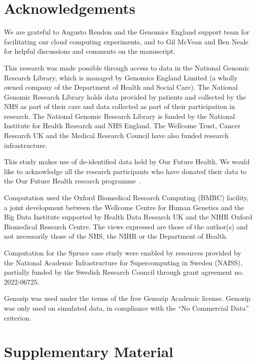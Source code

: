 \documentclass[a4paper,num-refs]{oup-contemporary}
\begin{document}
\section{Acknowledgements}
We are grateful to Augusto Rendon and the Genomics 
England support team for facilitating our cloud computing experiments,
and to Gil McVean and Ben Neale for helpful discussions and comments on the 
manuscript.

This research was made possible through access to data in the National Genomic
Research Library, which is managed by Genomics England Limited (a wholly owned
company of the Department of Health and Social Care). The National Genomic
Research Library holds data provided by patients and collected by the NHS as
part of their care and data collected as part of their participation in
research. The National Genomic Research Library is funded by the National
Institute for Health Research and NHS England. The Wellcome Trust, Cancer
Research UK and the Medical Research Council have also funded research
infrastructure.

This study makes use of de-identified data held by Our Future Health.
We would like to acknowledge all the research participants who have donated
their data to the Our Future Health research programme~\cite{ofhpubpolicy}.

Computation used the Oxford Biomedical Research Computing (BMRC) facility, a
joint development between the Wellcome Centre for Human Genetics and the Big
Data Institute supported by Health Data Research UK and the NIHR Oxford
Biomedical Research Centre. The views expressed are those of the author(s) and
not necessarily those of the NHS, the NIHR or the Department of Health.

Computation for the Spruce case study were enabled by resources
provided by the National Academic Infrastructure for Supercomputing in
Sweden (NAISS), partially funded by the Swedish Research Council
through grant agreement no. 2022-06725.

Genozip was used under the terms of the free Genozip Academic license.
Genozip was only used on simulated data, in compliance with
the ``No Commercial Data'' criterion.



\renewcommand\thefigure{S\arabic{figure}}
\setcounter{figure}{0}
\renewcommand\thetable{S\arabic{table}}
\setcounter{table}{0}

\section*{Supplementary Material}
\end{document}
